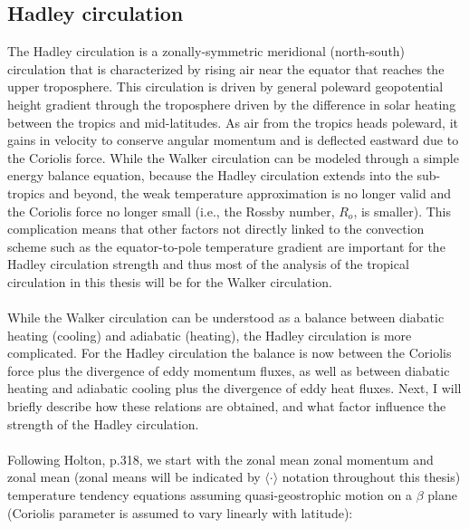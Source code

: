 \documentclass[letterpaper,12pt,titlepage,oneside,final]{book}
\begin{document}
\subsection{Hadley circulation}

The Hadley circulation is a zonally-symmetric meridional (north-south) circulation that is characterized by rising air near the equator that reaches the upper troposphere. This circulation is driven by general poleward geopotential height gradient through the troposphere driven by the difference in solar heating between the tropics and mid-latitudes. As air from the tropics heads poleward, it gains in velocity to conserve angular momentum and is deflected eastward due to the Coriolis force. While the Walker circulation can be modeled through a simple energy balance equation, because the Hadley circulation extends into the sub-tropics and beyond, the weak temperature approximation is no longer valid and the Coriolis force no longer small (i.e., the Rossby number, $R_{o}$, is smaller). This complication means that other factors not directly linked to the convection scheme such as the equator-to-pole temperature gradient are important for the Hadley circulation strength and thus most of the analysis of the tropical circulation in this thesis will be for the Walker circulation.
\\
\\
While the Walker circulation can be understood as a balance between diabatic heating (cooling) and adiabatic (heating), the Hadley circulation is more complicated. For the Hadley circulation the balance is now between the Coriolis force plus the divergence of eddy momentum fluxes, as well as between diabatic heating and adiabatic cooling plus the divergence of eddy heat fluxes. Next, I will briefly describe how these relations are obtained, and what factor influence the strength of the Hadley circulation. 
\\
\\
Following Holton, p.318, we start with the zonal mean zonal momentum and zonal mean (zonal means will be indicated by $\langle \cdot \rangle$ notation throughout this thesis) temperature tendency equations assuming quasi-geostrophic motion on a $\beta$ plane (Coriolis parameter is assumed to vary linearly with latitude):
\end{document}
